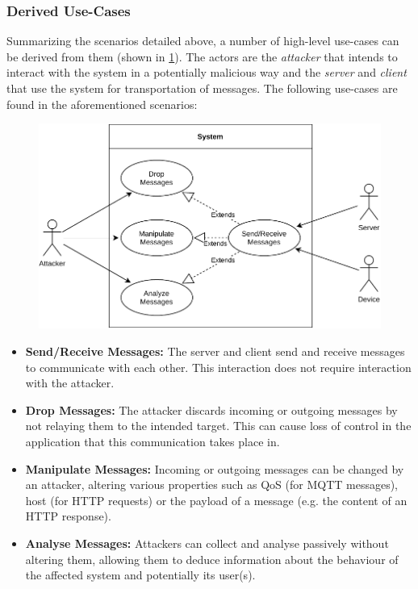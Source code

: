 \subsubsection{Derived Use-Cases} Summarizing the scenarios detailed above, a number of high-level use-cases can be derived from them (shown in \ref{fig:use-cases-scenarios}). The actors are the \emph{attacker} that intends to interact with the system in a potentially malicious way and the \emph{server} and \emph{client} that use the system for transportation of messages. The following use-cases are found in the aforementioned scenarios:

\begin{figure}[h]
    \centering
    \includegraphics[width=14cm]{img/ch04/UseCases_Scenarios.pdf}
    \label{fig:use-cases-scenarios}
\end{figure}


\begin{itemize}
    \item \textbf{Send/Receive Messages:} The server and client send and receive messages to communicate with each other. This interaction does not require interaction with the attacker.
    \item \textbf{Drop Messages:} The attacker discards incoming or outgoing messages by not relaying them to the intended target. This can cause loss of control in the application that this communication takes place in.
    \item \textbf{Manipulate Messages:} Incoming or outgoing messages can be changed by an attacker, altering various properties such as \ac{QoS} (for \ac{MQTT} messages), host (for \ac{HTTP} requests) or the payload of a message (e.g. the content of an \ac{HTTP} response).
    \item \textbf{Analyse Messages:} Attackers can collect and analyse passively without altering them, allowing them to deduce information about the behaviour of the affected system and potentially its user(s).
\end{itemize}


